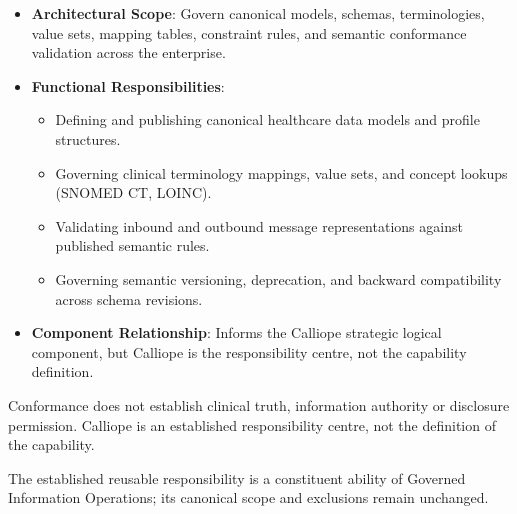 
\begin{itemize}

\item
\textbf{Architectural Scope}: Govern canonical models, schemas, terminologies, value sets, mapping tables, constraint rules, and semantic conformance validation across the enterprise.



\item
\textbf{Functional Responsibilities}:


\begin{itemize}

\item
Defining and publishing canonical healthcare data models and profile structures.



\item
Governing clinical terminology mappings, value sets, and concept lookups (SNOMED CT, LOINC).



\item
Validating inbound and outbound message representations against published semantic rules.



\item
Governing semantic versioning, deprecation, and backward compatibility across schema revisions.



\end{itemize}


\item
\textbf{Component Relationship}: Informs the Calliope strategic logical component, but Calliope is the responsibility centre, not the capability definition.



\end{itemize}


Conformance does not establish clinical truth, information authority or disclosure permission. Calliope is an established responsibility centre, not the definition of the capability.



The established reusable responsibility is a constituent ability of Governed Information Operations; its canonical scope and exclusions remain unchanged.



